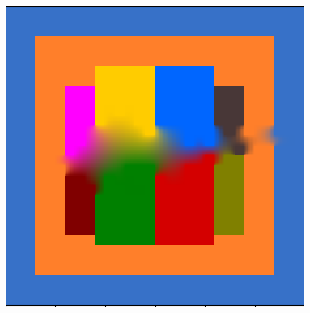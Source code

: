 \documentclass[letterpaper,10.7pt]{article}
\begin{document}
\begin{figure}[!htb]
\begin{minipage}[h]{0.3\textwidth}
  \label{fig:colores2}
   \end{minipage}
 \hfill
 \begin{minipage}[h]{0.3\textwidth}
  \centering
  \includegraphics[scale=0.45]{images/tarea3/with_300_px.png}
  \label{fig:colores3}
   \end{minipage}
\end{figure}
\end{document}
